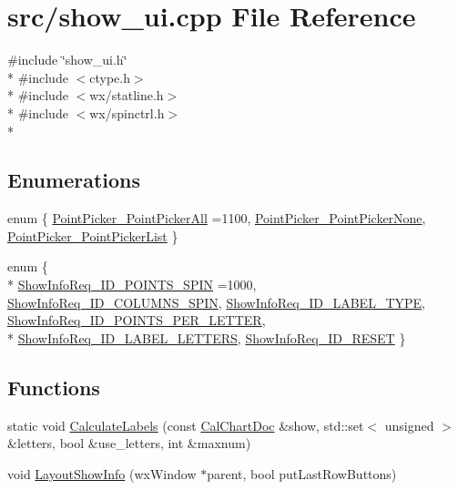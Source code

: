 \hypertarget{a00244}{\section{src/show\-\_\-ui.cpp File Reference}
\label{a00244}
}
{\ttfamily \#include \char`\"{}show\-\_\-ui.\-h\char`\"{}}\\*
{\ttfamily \#include $<$ctype.\-h$>$}\\*
{\ttfamily \#include $<$wx/statline.\-h$>$}\\*
{\ttfamily \#include $<$wx/spinctrl.\-h$>$}\\*
\subsection*{Enumerations}
\begin{DoxyCompactItemize}
\item 
enum \{ \hyperlink{a00244_ab04a0655cd1e3bcac5e8f48c18df1a57af37e69cac1007f2b95d5ab29419f3a10}{Point\-Picker\-\_\-\-Point\-Picker\-All} =1100, 
\hyperlink{a00244_ab04a0655cd1e3bcac5e8f48c18df1a57a6fb0684bdbfbac1ac0fd6ca2de68f1aa}{Point\-Picker\-\_\-\-Point\-Picker\-None}, 
\hyperlink{a00244_ab04a0655cd1e3bcac5e8f48c18df1a57af2bd8df0a45fbd0f10c1cb7fc3d3d2a7}{Point\-Picker\-\_\-\-Point\-Picker\-List}
 \}
\item 
enum \{ \\*
\hyperlink{a00244_a385c44f6fb256e5716a2302a5b940388aef108c1a11d61d81b71cadc8c5f83209}{Show\-Info\-Req\-\_\-\-I\-D\-\_\-\-P\-O\-I\-N\-T\-S\-\_\-\-S\-P\-I\-N} =1000, 
\hyperlink{a00244_a385c44f6fb256e5716a2302a5b940388ac8a5c26fde3e9e59efe4cd5cb6ebc1fa}{Show\-Info\-Req\-\_\-\-I\-D\-\_\-\-C\-O\-L\-U\-M\-N\-S\-\_\-\-S\-P\-I\-N}, 
\hyperlink{a00244_a385c44f6fb256e5716a2302a5b940388a39902470e7c0c7d12a922271070c8114}{Show\-Info\-Req\-\_\-\-I\-D\-\_\-\-L\-A\-B\-E\-L\-\_\-\-T\-Y\-P\-E}, 
\hyperlink{a00244_a385c44f6fb256e5716a2302a5b940388a8569eeefbc6ff1d3e06dd6315d038222}{Show\-Info\-Req\-\_\-\-I\-D\-\_\-\-P\-O\-I\-N\-T\-S\-\_\-\-P\-E\-R\-\_\-\-L\-E\-T\-T\-E\-R}, 
\\*
\hyperlink{a00244_a385c44f6fb256e5716a2302a5b940388afe2e9e9aaae00fd4cd3565029ab7217e}{Show\-Info\-Req\-\_\-\-I\-D\-\_\-\-L\-A\-B\-E\-L\-\_\-\-L\-E\-T\-T\-E\-R\-S}, 
\hyperlink{a00244_a385c44f6fb256e5716a2302a5b940388aafd7577686e8e1931d1fa0ac7e4d18e4}{Show\-Info\-Req\-\_\-\-I\-D\-\_\-\-R\-E\-S\-E\-T}
 \}
\end{DoxyCompactItemize}
\subsection*{Functions}
\begin{DoxyCompactItemize}
\item 
static void \hyperlink{a00244_a97d5605536ec90508d971e43b2c8340f}{Calculate\-Labels} (const \hyperlink{a00020}{Cal\-Chart\-Doc} \&show, std\-::set$<$ unsigned $>$ \&letters, bool \&use\-\_\-letters, int \&maxnum)
\item 
void \hyperlink{a00244_adf10eb99a294c2658a83d5dc08911809}{Layout\-Show\-Info} (wx\-Window $\ast$parent, bool put\-Last\-Row\-Buttons)
\end{DoxyCompactItemize}
